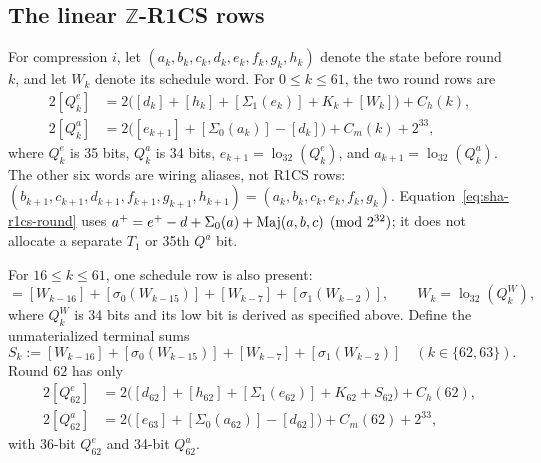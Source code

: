 \subsection{The linear $\mathbb Z$-R1CS rows}

For compression $i$, let $(a_k,b_k,c_k,d_k,e_k,f_k,g_k,h_k)$ denote the
state before round $k$, and let $W_k$ denote its schedule word.  For
$0\le k\le61$, the two round rows are
\begin{equation}
 \begin{aligned}
 2[Q^e_k]&=2\bigl([d_k]+[h_k]+[\Sigma_1(e_k)]+K_k+[W_k]\bigr)+C_h(k),\\
 2[Q^a_k]&=2\bigl([e_{k+1}]+[\Sigma_0(a_k)]-[d_k]\bigr)+C_m(k)+2^{33},
 \end{aligned}
 \label{eq:sha-r1cs-round}
\end{equation}
where $Q^e_k$ is 35 bits, $Q^a_k$ is 34 bits,
$e_{k+1}=\operatorname{lo}_{32}(Q^e_k)$, and
$a_{k+1}=\operatorname{lo}_{32}(Q^a_k)$.  The other six words are wiring
aliases, not R1CS rows:
$(b_{k+1},c_{k+1},d_{k+1},f_{k+1},g_{k+1},h_{k+1})
=(a_k,b_k,c_k,e_k,f_k,g_k)$.
Equation~\eqref{eq:sha-r1cs-round} uses
$a^+=e^+-d+\Sigma_0(a)+\operatorname{Maj}(a,b,c)\pmod{2^{32}}$; it does not allocate a
separate $T_1$ or 35th $Q^a$ bit.

For $16\le k\le61$, one schedule row is also present:
\begin{equation}
 [Q^W_k]=[W_{k-16}]+[\sigma_0(W_{k-15})]+[W_{k-7}]+[\sigma_1(W_{k-2})],
 \qquad W_k=\operatorname{lo}_{32}(Q^W_k),
 \label{eq:sha-r1cs-schedule}
\end{equation}
where $Q^W_k$ is 34 bits and its low bit is derived as specified above.
Define the unmaterialized terminal sums
\begin{equation}
 S_k:=[W_{k-16}]+[\sigma_0(W_{k-15})]+[W_{k-7}]+[\sigma_1(W_{k-2})]
 \quad(k\in\{62,63\}).
 \label{eq:sha-terminal-schedule}
\end{equation}
Round $62$ has only
\begin{equation}
 \begin{aligned}
 2[Q^e_{62}]&=2\bigl([d_{62}]+[h_{62}]+[\Sigma_1(e_{62})]+K_{62}+S_{62}\bigr)
   +C_h(62),\\
 2[Q^a_{62}]&=2\bigl([e_{63}]+[\Sigma_0(a_{62})]-[d_{62}]\bigr)
   +C_m(62)+2^{33},
 \end{aligned}
 \label{eq:sha-r1cs-round62}
\end{equation}
with 36-bit $Q^e_{62}$ and 34-bit $Q^a_{62}$.

